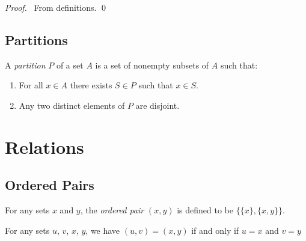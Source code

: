 \begin{proof}
    \pf\ From definitions. \qed
\end{proof}

\section{Partitions}

\begin{definition}[Partition]
    A \emph{partition} $P$ of a set $A$ is a set of nonempty subsets of $A$ such that:
    \begin{enumerate}
        \item For all $x \in A$ there exists $S \in P$ such that $x \in S$.
        \item Any two distinct elements of $P$ are disjoint.
    \end{enumerate}
\end{definition}

\chapter{Relations}

\section{Ordered Pairs}

\begin{definition}
    For any sets $x$ and $y$, the \emph{ordered pair} $(x,y)$ is defined to be $\{ \{ x \}, \{ x , y \} \}$.    
\end{definition}

\begin{theorem}
    For any sets $u$, $v$, $x$, $y$, we have $(u,v) = (x,y)$ if and only if $u = x$ and $v = y$
\end{theorem}

